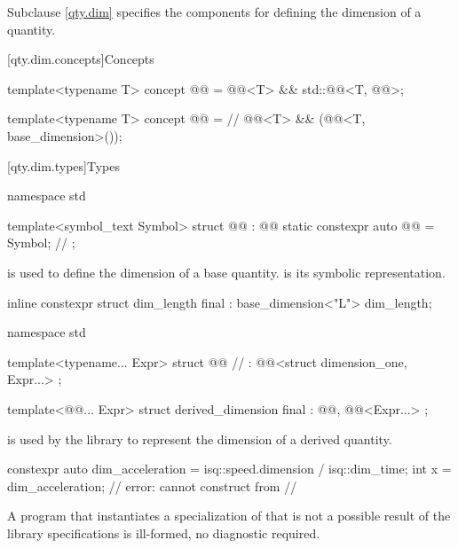 \pnum
Subclause \ref{qty.dim} specifies the components
for defining the dimension of a quantity.

[qty.dim.concepts]{Concepts}

\begin{itemdecl}
template<typename T>
concept @@ = @@<T> && std::@@<T, @@>;

template<typename T>
concept @@ =  // \expos
  @@<T> && (@@<T, base_dimension>());
\end{itemdecl}

[qty.dim.types]{Types}

\begin{codeblock}
namespace std {

template<symbol_text Symbol>
struct @@ : @@ {
  static constexpr auto @@ = Symbol;  // \expos
};

}
\end{codeblock}

\pnum
{} is used
to define the dimension of a base quantity.
 is its symbolic representation.
\begin{example}
\begin{codeblock}
inline constexpr struct dim_length final : base_dimension<"L"> {} dim_length;
\end{codeblock}
\end{example}

\begin{codeblock}
namespace std {

template<typename... Expr>
struct @@  // \expos
    : @@<struct dimension_one, Expr...> {};

template<@@... Expr>
struct derived_dimension final : @@, @@<Expr...> {};

}
\end{codeblock}

\pnum
{} is used by the library
to represent the dimension of a derived quantity.
\begin{example}
\begin{codeblock}
constexpr auto dim_acceleration = isq::speed.dimension / isq::dim_time;
int x = dim_acceleration;  // error: cannot construct from
  // 
\end{codeblock}
\end{example}
A program that instantiates a specialization of 
that is not a possible result of the library specifications
is ill-formed, no diagnostic required.

